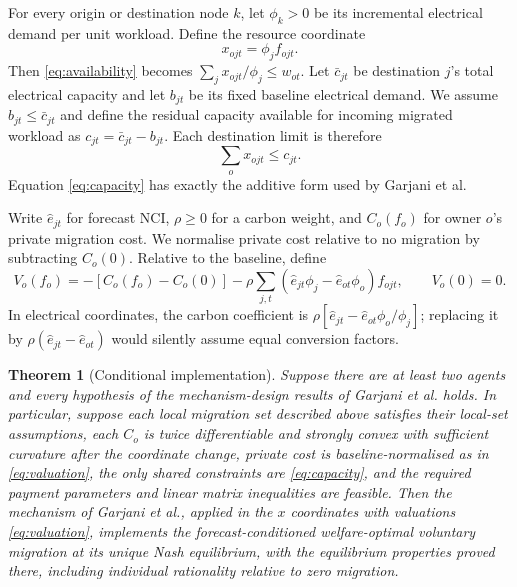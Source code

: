 \documentclass{article}
\newtheorem{theorem}{Theorem}
\begin{document}
For every origin or destination node $k$, let $\phi_k>0$ be its incremental electrical demand per unit workload. Define the resource coordinate
\begin{equation}
  x_{ojt}=\phi_j f_{ojt}.
\end{equation}
Then \eqref{eq:availability} becomes $\sum_j x_{ojt}/\phi_j\leq w_{ot}$. Let $\bar c_{jt}$ be destination $j$'s total electrical capacity and let $b_{jt}$ be its fixed baseline electrical demand. We assume $b_{jt}\leq\bar c_{jt}$ and define the residual capacity available for incoming migrated workload as $c_{jt}=\bar c_{jt}-b_{jt}$. Each destination limit is therefore
\begin{equation}
  \sum_o x_{ojt}\leq c_{jt}.
  \label{eq:capacity}
\end{equation}
Equation \eqref{eq:capacity} has exactly the additive form used by Garjani et al.

Write $\widehat e_{jt}$ for forecast NCI, $\rho\geq0$ for a carbon weight, and $C_o(f_o)$ for owner $o$'s private migration cost. We normalise private cost relative to no migration by subtracting $C_o(0)$. Relative to the baseline, define
\begin{equation}
 V_o(f_o)=-[C_o(f_o)-C_o(0)]-\rho\sum_{j,t}
 (\widehat e_{jt}\phi_j-\widehat e_{ot}\phi_o)f_{ojt},
 \qquad V_o(0)=0.
 \label{eq:valuation}
\end{equation}
In electrical coordinates, the carbon coefficient is
$\rho[\widehat e_{jt}-\widehat e_{ot}\phi_o/\phi_j]$; replacing it by
$\rho(\widehat e_{jt}-\widehat e_{ot})$ would silently assume equal conversion factors.

\begin{theorem}[Conditional implementation]
Suppose there are at least two agents and every hypothesis of the mechanism-design results of Garjani et al. holds. In particular, suppose each local migration set described above satisfies their local-set assumptions, each $C_o$ is twice differentiable and strongly convex with sufficient curvature after the coordinate change, private cost is baseline-normalised as in \eqref{eq:valuation}, the only shared constraints are \eqref{eq:capacity}, and the required payment parameters and linear matrix inequalities are feasible. Then the mechanism of Garjani et al., applied in the $x$ coordinates with valuations \eqref{eq:valuation}, implements the forecast-conditioned welfare-optimal voluntary migration at its unique Nash equilibrium, with the equilibrium properties proved there, including individual rationality relative to zero migration.
\end{theorem}
\end{document}
